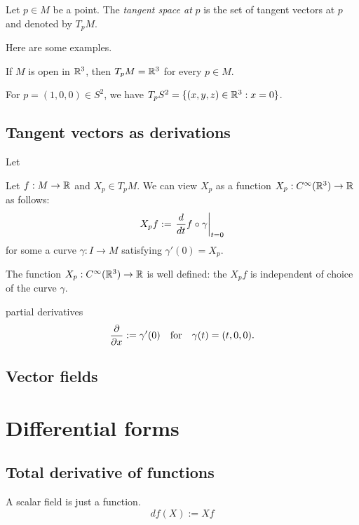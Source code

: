 \documentclass{../exp}
\begin{document}
\begin{defn}
Let $p\in M$ be a point.
The \emph{tangent space at} $p$ is the set of tangent vectors at $p$ and denoted by $T_pM$.
\end{defn}
Here are some examples.
\begin{ex}
If $M$ is open in $\mathbb{R}^3$, then $T_pM=\mathbb{R}^3$ for every $p\in M$.
\end{ex}
\begin{ex}
For $p=(1,0,0)\in S^2$, we have $T_pS^2=\{(x,y,z)\in\mathbb{R}^3:x=0\}$.
\end{ex}


\subsection{Tangent vectors as derivations}

\begin{defn}[Derivation]
Let 
\end{defn}
\begin{defn}
Let $f:M\to\R$ and $X_p\in T_pM$.
We can view $X_p$ as a function 
$X_p:C^\oo(\R^3)\to\R$ as follows:
\[X_pf:=\evalat{\dd{t}f\o\gamma}{t=0}\]
for some a curve $\gamma:I\to M$ satisfying $\gamma'(0)=X_p$.
\end{defn}
\begin{prop}
The function $X_p:C^\oo(\R^3)\to\R$ is well defined: the $X_pf$ is independent of choice of the curve $\gamma$.
\end{prop}

partial derivatives
\[\pd{x}:=\gamma'(0)\quad\text{for}\quad \gamma(t)=(t,0,0).\]

\subsection{Vector fields}























\section{Differential forms}
\subsection{Total derivative of functions}
A scalar field is just a function.
\[df(X):=Xf\]
\end{document}
